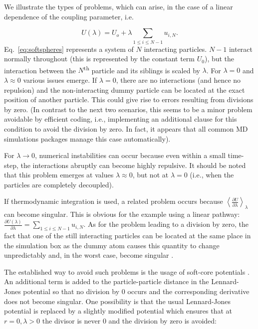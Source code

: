 We illustrate the types of problems, which can arise, in the case
of a linear dependence of the coupling parameter,
i.e.

\begin{equation}\label{eq:softspheres}
U\left(\lambda\right)=U_{o}+\lambda\sum_{1\leq i\leq N-1}u_{i,N}.
\end{equation}
Eq.~\ref{eq:softspheres} represents a system of $N$ interacting particles. $N-1$ interact normally throughout (this is represented by the constant term $U_0$), but the interaction between the $N$\textsuperscript{th} particle and its siblings is scaled by $\lambda$.
For $\lambda=0$ and $\lambda\approx0$ various
issues emerge. 
If $\lambda=0$, there are no interactions (and hence
no repulsion) and the non-interacting dummy particle can be located
at the exact position of another particle. This could give rise to
errors resulting from divisions by zero. (In contrast to the next two scenarios,
this seems to be a minor problem avoidable by efficient coding, i.e.,
implementing an additional clause for this condition to avoid the division by zero. In fact, it appears that all common MD
simulations packages manage this case automatically\cite{Boresch.2011}).

For $\lambda\rightarrow0$, numerical instabilities can occur because
even within a small time-step, the interactions abruptly can become highly repulsive.
It should be noted that this problem emerges at values $\lambda\approx0$,
but not at $\lambda=0$ (i.e., when the particles are completely decoupled).

If thermodynamic integration is used, a related problem occurs because
$\left\langle \frac{\partial U}{\partial\lambda}\right\rangle _{\lambda}$can
become singular. This is obvious for the example using a linear pathway:
$\frac{\partial U\left(\lambda\right)}{\partial\lambda}=\sum_{1\leq i\leq N-1}u_{i,N}$.
As for the problem leading to a division by zero, the fact that one of the
still interacting particles can be located at the same place
in the simulation box as the dummy atom causes this quantity to change
unpredictably and, in the worst case, become singular \cite{Boresch.2011}.

The established way to avoid such problems is the usage of soft-core potentials \cite{Beutler.1994,Zacharias.1994,Steinbrecher.2011}.
An additional term is added to the particle-particle distance in the Lennard-Jones potential so that
no division by 0 occurs and the corresponding derivative does not
become singular. One possibility is that the usual Lennard-Jones potential is replaced by
a slightly modified potential which ensures that at $r=0,\lambda>\text{0}$
the divisor is never 0 and the division by zero is avoided:

